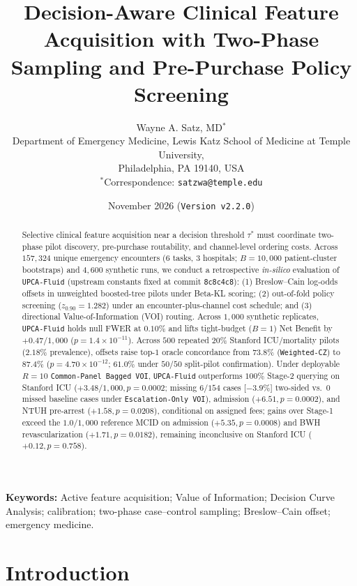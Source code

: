 \documentclass[11pt]{article}
\title{\textbf{Decision-Aware Clinical Feature Acquisition with Two-Phase Sampling and Pre-Purchase Policy Screening}}
\author{
  Wayne A. Satz, MD$^*$\\
  \small Department of Emergency Medicine, Lewis Katz School of Medicine at Temple University,\\
  \small Philadelphia, PA 19140, USA\\
  \small $^*$Correspondence: \texttt{satzwa@temple.edu}
}
\date{November 2026 \quad (\texttt{Version v2.2.0})}
\theoremstyle{remark}
\begin{document}
\maketitle

\begin{abstract}
Selective clinical feature acquisition near a decision threshold $\tau^*$ must coordinate two-phase pilot discovery, pre-purchase routability, and channel-level ordering costs. Across $157{,}324$ unique emergency encounters ($6$ tasks, $3$ hospitals; $B=10{,}000$ patient-cluster bootstraps) and $4{,}600$ synthetic runs, we conduct a retrospective \emph{in-silico} evaluation of \texttt{UPCA-Fluid} (upstream constants fixed at commit \texttt{8c8c4c8}): (1) Breslow--Cain log-odds offsets in unweighted boosted-tree pilots under Beta-KL scoring; (2) out-of-fold policy screening ($z_{0.90}=1.282$) under an encounter-plus-channel cost schedule; and (3) directional Value-of-Information (VOI) routing. Across $1{,}000$ synthetic replicates, \texttt{UPCA-Fluid} holds null FWER at $0.10\%$ and lifts tight-budget ($B=1$) Net Benefit by $+0.47/1{,}000$ ($p=1.4\times 10^{-11}$). Across $500$ repeated $20\%$ Stanford ICU/mortality pilots ($2.18\%$ prevalence), offsets raise top-$1$ oracle concordance from $73.8\%$ (\texttt{Weighted-CZ}) to $87.4\%$ ($p=4.70\times 10^{-12}$; $61.0\%$ under $50/50$ split-pilot confirmation). Under deployable $R=10$ \texttt{Common-Panel Bagged VOI}, \texttt{UPCA-Fluid} outperforms $100\%$ Stage-2 querying on Stanford ICU ($+3.48/1{,}000, p=0.0002$; missing $6/154$ cases [$-3.9\%$] two-sided vs.\ $0$ missed baseline cases under \texttt{Escalation-Only VOI}), admission ($+6.51, p=0.0002$), and NTUH pre-arrest ($+1.58, p=0.0208$), conditional on assigned fees; gains over Stage-1 exceed the $1.0/1{,}000$ reference MCID on admission ($+5.35, p=0.0008$) and BWH revascularization ($+1.71, p=0.0182$), remaining inconclusive on Stanford ICU ($+0.12, p=0.758$).
\end{abstract}

\vspace{4pt}
\noindent\textbf{Keywords:} Active feature acquisition; Value of Information; Decision Curve Analysis; calibration; two-phase case--control sampling; Breslow--Cain offset; emergency medicine.

\section{Introduction}
\label{sec:intro}
\end{document}
